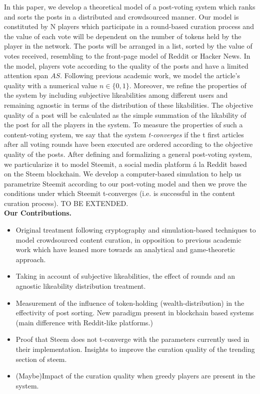   
  In this paper, we develop a theoretical model of a post-voting system which ranks and sorts the posts in a distributed and crowdsourced manner. Our model is constituted by N players which participate in a round-based curation process and the value of each vote will be dependent on the number of tokens held by the player in the network. The posts will be arranged in a list, sorted by the value of votes received, resembling to the front-page model of Reddit or Hacker News. In the model, players vote according to the quality of the posts and have a limited attention span $AS$. Following previous academic work, we model the article's quality with a numerical value $n \in \lbrace 0,1 \rbrace$. Moreover, we refine the properties of the system by including subjective likeabilities among different users and remaining agnostic in terms of the distribution of these likabilities. The objective quality of a post will be calculated as the simple summation of the likability of the post for all the players in the system. To measure the properties of such a content-voting system, we say that the system \textit{t-converges} if the t first articles after all voting rounds have been executed are ordered according to the objective quality of the posts.
  After defining and formalizing a general post-voting system, we particularize it to model Steemit, a social media platform á la Reddit based on the Steem blockchain. We develop a computer-based simulation to help us parametrize Steemit according to our post-voting model and then we prove the conditions under which Steemit t-converges (i.e. is successful in the content curation process). TO BE EXTENDED.\\
  
  \textbf{Our Contributions.}  
  
  \begin{itemize}
  
  \item Original treatment following cryptography and simulation-based techniques to model crowdsourced content curation, in opposition to previous academic work which have leaned more towards an analytical and game-theoretic approach.
  
  \item Taking in account of subjective likeabilities, the effect of rounds and an agnostic likeability distribution treatment.
  
  \item Measurement of the influence of token-holding (wealth-distribution) in the effectivity of post sorting. New paradigm present in blockchain based systems (main difference with Reddit-like platforms.)
   
  \item Proof that Steem does not t-converge with the parameters currently used in their implementation. Insights to improve the curation quality of the trending section of steem.
   
  \item (Maybe)Impact of the curation quality when greedy players are present in the system.
   
  \end{itemize}
    

  
  
  